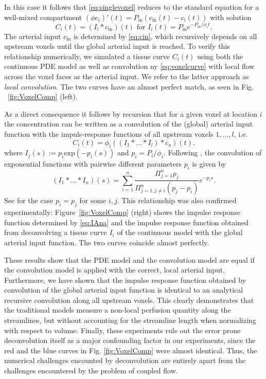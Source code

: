 \documentclass[journal,twocolumn]{IEEEtran}
\newcommand{\ca}{c_\mathrm{a}}
\begin{document}
	In this case it follows that \eqref{eq:singlevoxel} reduces to the standard equation for a well-mixed compartment $(\phi c_i)'(t) = P_{\mathrm{in}} (c_\mathrm{in}(t) - c_i(t))$ 
	with solution
	\begin{equation}\label{eq:voxelcurve}
		C_i(t) = (I_i*c_{\mathrm{in}})(t)
			\text{ for } I_i(t)=P_{\mathrm{in}}e^{- P_{\mathrm{in}}/\phi_it}.
	\end{equation}
	The arterial input $c_{\mathrm{in}}$ is determined by \eqref{eq:cin}, which recursively depends on all upstream voxels until the global arterial input is reached.
	To verify this relationship numerically, we simulated a tissue curve $C_i(t)$ using both the continuous PDE model as well as convolution ny \eqref{eq:voxelcurve} with local flow across the voxel faces as the arterial input. We refer to the latter approach as \textit{local convolution}. The two curves have an almost perfect match, as seen in Fig. ~\ref{fig:VoxelComp} (left).
		
	As a direct consequence it follows by recursion that for a given voxel at location $i$ the concentration can be written as a convolution of the (global) arterial input function with the impuls-response functions of all upstream voxels $1,\hdots,l$, i.e.
	\begin{equation}
		C_i(t) = \phi_i((I_1*\dots *I_l)*\ca)(t).
		\label{eq:C_recur}
	\end{equation}
	where $I_j(s):=p_i\mathrm{exp}(- p_i(s))$ and $p_i=P_i/\phi_i$.
	Following \cite{Kordecki97}, the convolution of exponential functions with pairwise different parameters $p_i$ is given by
	\begin{equation}\label{eq:IAna}
		(I_1*\dots *I_n)(s) = \sum_{i=1}^n \frac{\Pi_{j=1}^n p_j}{\Pi_{j=1,j\neq i}^n(p_j-p_i)}e^{-p_is}.
	\end{equation}
	See \cite{Kordecki97} for the case $p_i=p_j$ for some $i,j$.
	This relationship was also confirmed experimentally: Figure~\ref{fig:VoxelComp} (right) shows the impulse response function determined by \eqref{eq:IAna} and the impulse response function obtained from deconvolving a tissue curve $I_i$ of the continuous model with the global arterial input function.
	The two curves coincide almost perfectly.
	
These results show that the PDE model and the convolution model are equal if the convolution model is applied with the correct, local arterial input. Furthermore, we have shown that the impulse response function obtained by convolution of the global arterial input function is identical to an analytical recursive convolution along all upstream voxels. This clearly demonstrates that the traditional models measure a non-local perfusion quantity along the streamlines, but without accounting for the streamline length when normalizing with respect to volume. Finally, these experiments rule out the error prone deconvolution itself as a major confounding factor in our experiments, since the red and the blue curves in Fig. \ref{fig:VoxelComp} were almost identical. Thus, the numerical challenges encounted by deconvolution are entirely apart from the challenges encountered by the problem of coupled flow.
	
\end{document}
